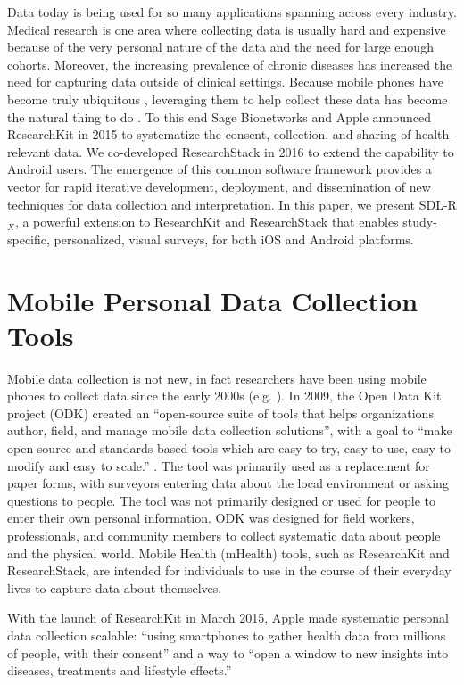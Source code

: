 \documentclass{acm_proc_article-sp}
\newcommand{\sdlrx}{SDL-R$_X$}
\begin{document}
Data today is being used for so many applications spanning across every industry.
Medical research is one area where collecting data is usually hard and expensive because of the very personal nature of the data and the need for large enough cohorts. Moreover, the increasing prevalence of chronic diseases \cite{Pollak2011-mq,Consolvo2003-xv} has increased the need for capturing data outside of clinical settings.  Because mobile phones have become truly ubiquitous , leveraging them to help collect these data has become the natural thing to do \cite{noauthor_undated-ze,noauthor_undated-hv}.  To this end Sage Bionetworks and Apple announced ResearchKit in 2015 to systematize the consent, collection, and sharing of health-relevant data.  We co-developed ResearchStack in 2016 to extend the capability to Android users. The emergence of this common software framework provides a vector for rapid iterative development, deployment, and dissemination of new techniques for data collection and interpretation.  In this paper, we present \sdlrx{}, a powerful extension to ResearchKit and ResearchStack that enables study-specific, personalized, visual surveys, for both iOS and Android platforms.


\section{Mobile Personal Data Collection Tools }
Mobile data collection is not new, in fact researchers have been using mobile phones to collect data since the early 2000s (e.g. \cite{Center_for_Disease_Control_and_Prevention_undated-ik}). In 2009, the Open Data Kit project (ODK) created an ``open-source suite of tools that helps organizations author, field, and manage mobile data collection solutions'', with a goal to ``make open-source and standards-based tools which are easy to try, easy to use, easy to modify and easy to scale.'' \cite{noauthor_undated-tj}. The tool was primarily used as a replacement for paper forms, with surveyors entering data about the local environment or asking questions to people. The tool was not primarily designed or used for people to enter their own personal information. ODK was designed for field workers, professionals, and community members to collect systematic data about people and the physical world.  Mobile Health (mHealth) tools, such as ResearchKit and ResearchStack, are intended for individuals to use in the course of their everyday lives to capture data about themselves.

With the launch of ResearchKit in March 2015, Apple made systematic personal data collection scalable: ``using smartphones to gather health data from millions of people, with their consent'' and a way to ``open a window to new insights into diseases, treatments and lifestyle effects.'' \cite{Apple_undated-rz}
\end{document}
